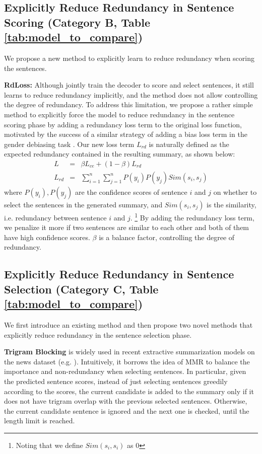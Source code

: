 \documentclass[11pt,a4paper]{article}
\begin{document}
\subsection{Explicitly Reduce Redundancy in Sentence Scoring (Category B, Table \ref{tab:model_to_compare})}
We propose a new method to explicitly learn to reduce redundancy when scoring the sentences.

\textbf{RdLoss:}
Although  jointly train the decoder to score and select sentences, it still learns to reduce redundancy implicitly, and the method does not allow controlling the degree of redundancy. To address this limitation, we propose a rather simple method to explicitly force the model to reduce redundancy in the sentence scoring phase by adding 
a redundancy loss term
to the original loss function, motivated by the success of a similar strategy of adding a bias loss term in the gender debiasing task \cite{qian-etal-2019-reducing}. Our new loss term $L_{rd}$ is naturally defined as the expected redundancy contained in the resulting summary, as shown below:
\vspace{-2mm}
\begin{eqnarray*}
L &=& \beta L_{ce}+ (1-\beta) L_{rd}\\
L_{rd}&=&\sum_{i=1}^{n} \sum_{j=1}^{n} P(y_i)P(y_j)Sim(s_i, s_j)
\end{eqnarray*}
where $P(y_i),P(y_j)$ are the confidence scores of sentence $i$ and $j$ on whether to select the sentences in the generated summary, and $Sim(s_i,s_j)$ is the similarity, i.e. redundancy between sentence $i$ and $j$. \footnote{Noting that we define $Sim(s_i,s_i)$ as $0$} By adding the redundancy loss term, we penalize it more if two sentences are similar to each other and both of them have high confidence scores. $\beta$ is a balance factor, controlling the degree of redundancy.
\vspace{-1mm}
\subsection{Explicitly Reduce Redundancy in Sentence Selection (Category C, Table \ref{tab:model_to_compare})}
We first introduce an existing method and then propose two novel methods that explicitly reduce redundancy in the sentence selection phase.

\textbf{Trigram Blocking} is widely used in  recent extractive summarization models on the news
dataset (e.g. \citet{liu-lapata-2019-text}). Intuitively, it borrows the idea of MMR to balance the importance and non-redundancy when selecting sentences. In particular, given the predicted sentence scores, instead of just selecting sentences greedily according to the scores, the current candidate is added to the summary only if it does not have trigram overlap with the previous selected sentences. Otherwise, the current candidate sentence is ignored and the next one is checked, until the length limit is reached.
\end{document}
